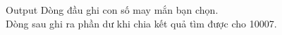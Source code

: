 Output
Dòng đầu ghi con số may mắn bạn chọn.   
\\   Dòng sau ghi ra phần dư khi chia kết quả tìm được cho 10007.